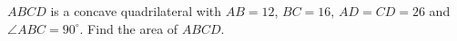 $ABCD$ is a concave quadrilateral with $AB=12$, $BC=16$, $AD=CD=26$ and $\angle ABC=90^\circ$. Find the area of $ABCD$.
